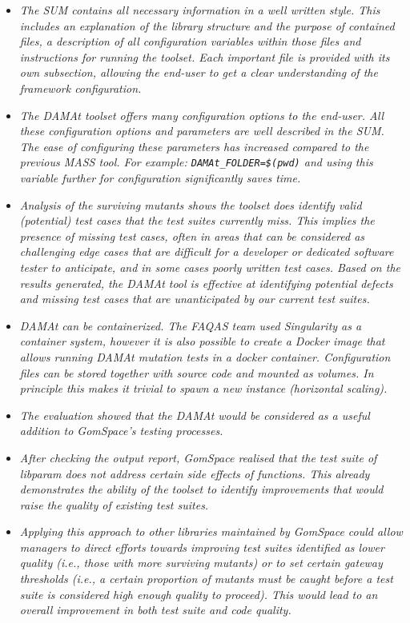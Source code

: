 \begin{itemize}

  \item \emph{The SUM contains all necessary information in a well written style. This includes an explanation of the library structure and the purpose of contained files, a description of all configuration variables within those files and instructions for running the toolset. Each important file is provided with its own subsection, allowing the end-user to get a clear understanding of the framework configuration.}

  \item \emph{The DAMAt toolset offers many configuration options to the end-user. All these configuration options and parameters are well described in the SUM. The ease of configuring these parameters has increased compared to the previous MASS tool. For example: \texttt{DAMAt\_FOLDER=\$(pwd)} and using this variable further for configuration significantly saves time.}

  \item \emph{Analysis of the surviving mutants shows the toolset does identify valid (potential) test cases that the test suites currently miss. This implies the presence of missing test cases, often in areas that can be considered as challenging edge cases that are difficult for a developer or dedicated software tester to anticipate, and in some cases poorly written test cases. Based on the results generated, the DAMAt tool is effective at identifying potential defects and missing test cases that are unanticipated by our current test suites.}

  \item \emph{DAMAt can be containerized. The FAQAS team used Singularity as a container system, however it is also possible to create a Docker image that allows running DAMAt mutation tests in a docker container. Configuration files can be stored together with source code and mounted as volumes. In principle this makes it trivial to spawn a new instance (horizontal scaling).}

  \item \emph{The evaluation showed that the DAMAt would be considered as a useful addition to GomSpace’s testing processes.}

  \item \emph{After checking the output report, GomSpace realised that the test suite of libparam does not address certain side effects of functions. This already demonstrates the ability of the toolset to identify improvements that would raise the quality of existing test suites.}

  \item \emph{Applying this approach to other libraries maintained by GomSpace could allow managers to direct efforts towards improving test suites identified as lower quality (i.e., those with more surviving mutants) or to set certain gateway thresholds (i.e., a certain proportion of mutants must be caught before a test suite is considered high enough quality to proceed). This would lead to an overall improvement in both test suite and code quality.}

\end{itemize}

